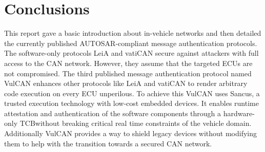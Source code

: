 
\section{Conclusions}

This report gave a basic introduction about in-vehicle networks and then
detailed the currently published AUTOSAR-compliant message authentication
protocols. The software-only protocols LeiA and vatiCAN secure against attackers
with full access to the CAN network. However, they assume that the targeted ECUs
are not compromised. The third published message authentication protocol named
VulCAN enhances other protocols like LeiA and vatiCAN to render arbitrary code
execution on every ECU unperilous. To achieve this VulCAN uses Sancus, a trusted
execution technology with low-cost embedded devices. It enables runtime
attestation and authentication of the software components through a
hardware-only TCB\@ without breaking critical real time constraints of the
vehicle domain. Additionally VulCAN provides a way to shield legacy devices
without modifying them to help with the transition towards a secured CAN
network. 